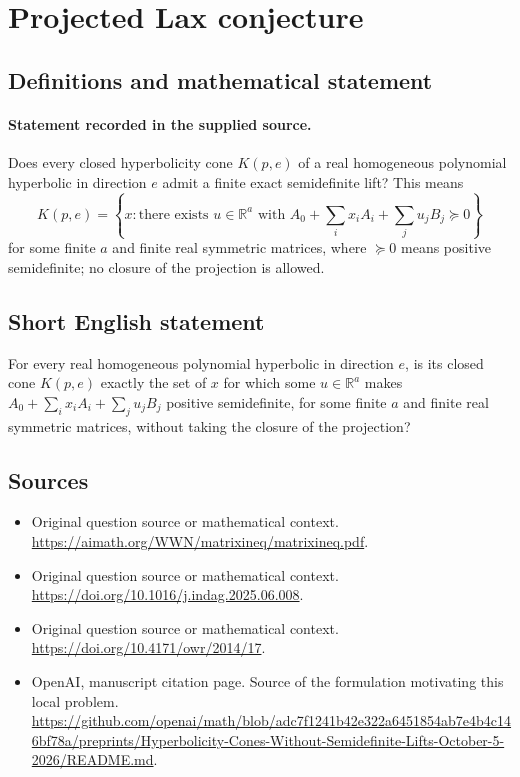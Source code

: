 \documentclass[11pt]{article}
\begin{document}
\section*{Projected Lax conjecture}\label{30007125}
\subsection{Definitions and mathematical statement}
\paragraph{Statement recorded in the supplied source.}
Does every closed hyperbolicity cone $K(p,e)$ of a real homogeneous polynomial hyperbolic in direction $e$ admit a finite exact semidefinite lift? This means
\[
K(p,e)=\left\{x:\text{there exists }u\in\mathbb{R}^a\text{ with }A_0+\sum_i x_iA_i+\sum_j u_jB_j\succeq0\right\}
\]
for some finite $a$ and finite real symmetric matrices, where $\succeq0$ means positive semidefinite; no closure of the projection is allowed.
\subsection{Short English statement}
For every real homogeneous polynomial hyperbolic in direction $e$, is its closed cone $K(p,e)$ exactly the set of $x$ for which some $u\in\mathbb{R}^a$ makes $A_0+\sum_i x_iA_i+\sum_j u_jB_j$ positive semidefinite, for some finite $a$ and finite real symmetric matrices, without taking the closure of the projection?
\subsection{Sources}
\begin{itemize}
\item[S1] Original question source or mathematical context.
\url{https://aimath.org/WWN/matrixineq/matrixineq.pdf}.
\item[S2] Original question source or mathematical context.
\url{https://doi.org/10.1016/j.indag.2025.06.008}.
\item[S3] Original question source or mathematical context.
\url{https://doi.org/10.4171/owr/2014/17}.
\item[S4] OpenAI, manuscript citation page. Source of the formulation motivating this local problem.
\url{https://github.com/openai/math/blob/adc7f1241b42e322a6451854ab7e4b4c146bf78a/preprints/Hyperbolicity-Cones-Without-Semidefinite-Lifts-October-5-2026/README.md}.
\end{itemize}
\end{document}
